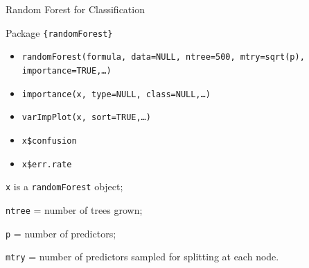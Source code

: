 

\begin{frame}{Random Forest for Classification}

{\small Package \texttt{\{randomForest\}}\vspace{-1.5ex}
\begin{itemize}\setlength{\itemsep}{-0.5ex}
	\item \lstinline|randomForest(formula, data=NULL, ntree=500, mtry=sqrt(p), importance=TRUE,|\texttt{\dots)}
	\item \lstinline|importance(x, type=NULL, class=NULL,|\texttt{\dots)}
    \item \lstinline|varImpPlot(x, sort=TRUE,|\texttt{\dots)}
    \item \texttt{x\$confusion}
    \item \texttt{x\$err.rate}
\end{itemize}}

{\texttt{x}} is a {\texttt{randomForest}} object;

{\texttt{ntree}} = number of trees grown;

{\texttt{p}} = number of predictors;

{\texttt{mtry}} = number of predictors sampled for splitting at each node.

\end{frame}


